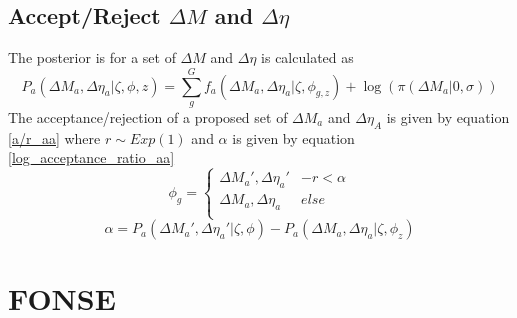 \documentclass[11pt]{article}
\begin{document}
  \subsection{Accept/Reject $\Delta M$ and $\Delta \eta$}
  The posterior is for a set of $\Delta M$ and $\Delta \eta$ is calculated as
    \begin{equation}
    P_a(\Delta M_a, \Delta \eta_a|\zeta, \phi, z) = \sum_g^G f_a(\Delta M_a, \Delta \eta_a|\zeta, \phi_{g,z}) + \log(\pi(\Delta M_a| 0, \sigma))
    \label{roc_lik_csp}
  \end{equation}
  The acceptance/rejection of a proposed set of $\Delta M_a$ and $\Delta \eta_A$ is given by equation \ref{a/r_aa} where $r \sim Exp(1)$ and $\alpha$ is given by equation \ref{log_acceptance_ratio_aa}
  \begin{equation}
    \phi_g = 
    \begin{cases}
      \Delta M_a', \Delta \eta_a'	& -r < \alpha \\
      \Delta M_a, \Delta \eta_a		& else \\
    \end{cases}
     \label{a/r_aa}
  \end{equation}  
  \begin{equation}
    \alpha = P_a(\Delta M_a', \Delta \eta_a'|\zeta, \phi) - P_a(\Delta M_a, \Delta \eta_a|\zeta, \phi_z)
    \label{log_acceptance_ratio_aa}
  \end{equation}
  

  
  \section{FONSE}
  
\end{document}
